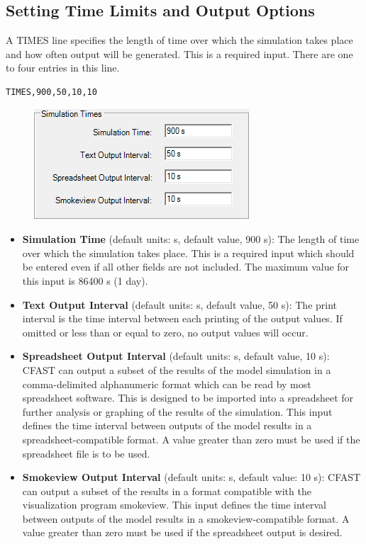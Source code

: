 \subsection{Setting Time Limits and Output Options}

A TIMES line specifies the length of time over which the simulation takes place and how often output will be generated. This is a required input. There are one to four entries in this line.

\begin{lstlisting}
TIMES,900,50,10,10
\end{lstlisting}

\begin{figure}[h!]
\begin{center}
\includegraphics[width=3.167in]{FIGURES/Input_File/Simulation_Times}
\end{center}
\end{figure}

\begin{itemize}
\item \textbf{Simulation Time} (default units: s, default value, 900 s): The length of time over which the simulation takes place.  This is a required input which should be entered even if all other fields are not included. The maximum value for this input is 86400 s (1 day).

\item \textbf{Text Output Interval} (default units: s, default value, 50 s): The print interval is the time interval between each printing of the output values.  If omitted or less than or equal to zero, no output values will occur.

\item \textbf{Spreadsheet Output Interval} (default units: s, default value, 10 s): CFAST can output a subset of the results of the model simulation in a comma-delimited alphanumeric format which can be read by most spreadsheet software. This is designed to be imported into a spreadsheet for further analysis or graphing of the results of the simulation.  This input defines the time interval between outputs of the model results in a spreadsheet-compatible format. A value greater than zero must be used if the spreadsheet file is to be used.

\item \textbf{Smokeview Output Interval} (default units: s, default value: 10 s): CFAST can output a subset of the results in a format compatible with the visualization program smokeview. This input defines the time interval between outputs of the model results in a smokeview-compatible format.  A value greater than zero must be used if the spreadsheet output is desired.
\end{itemize}

